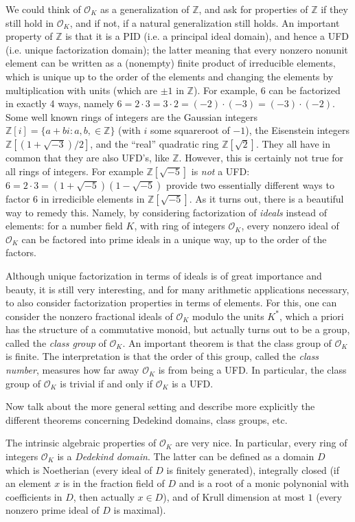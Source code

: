 \documentclass[a4paper,USenglish,cleveref, autoref, thm-restate]{lipics-v2021}
\newcommand{\OK}[1][K]{\mathcal{O}_{#1}}
\newcommand{\Z}{\mathbb{Z}}
\begin{document}
We could think of $\OK$ as a generalization of $\Z$, and ask for properties of $\Z$ if they still hold in $\OK$, and if not, if a natural generalization still holds. An important property of $\Z$ is that it is a PID (i.e. a principal ideal domain), and hence a UFD (i.e. unique factorization domain); the latter meaning that every nonzero nonunit element can be written as a (nonempty) finite product of irreducible elements, which is unique up to the order of the elements and changing the elements by multiplication with units (which are $\pm 1$ in $\Z$).
For example, $6$ can be factorized in exactly 4 ways, namely $6=2\cdot 3=3\cdot2=(-2)\cdot (-3)=(-3) \cdot (-2)$. Some well known rings of integers are the Gaussian integers $\Z[i]=\{a+b i : a,b, \in \Z\}$ (with $i$ some squareroot of $-1$), the Eisenstein integers $\Z[(1+\sqrt{-3})/2]$, and the ``real'' quadratic ring $\Z[\sqrt{2}]$. They all have in common that they are also UFD's, like $\Z$. However, this is certainly not true for all rings of integers. For example $\Z[\sqrt{-5}]$ is \emph{not} a UFD: $6=2\cdot3=(1+\sqrt{-5}) (1-\sqrt{-5})$ provide two essentially different ways to factor $6$ in irredicible elements in $\Z[\sqrt{-5}]$.
As it turns out, there is a beautiful way to remedy this. Namely,  by considering factorization of \emph{ideals} instead of elements: for a number field $K$, with ring of integers $\OK$, every nonzero ideal of $\OK$ can be factored into prime ideals in a unique way, up to the order of the factors.

Although unique factorization in terms of ideals is of great importance and beauty, it is still very interesting, and for many arithmetic applications necessary, to also consider factorization properties in terms of elements. For this, one can consider the nonzero fractional ideals of $\OK$ modulo the units $K^*$, which a priori has the structure of a commutative monoid, but actually turns out to be a group, called the \emph{class group} of $\OK$. An important theorem is that the class group of $\OK$ is finite. The interpretation is that the order of this group, called the \emph{class number}, measures how far away $\OK$ is from being a UFD. In particular, the class group of $\OK$ is trivial if and only if $\OK$ is a UFD.

Now talk about the more general setting and describe more explicitly  the different theorems concerning Dedekind domains, class groups, etc.

The intrinsic algebraic properties of $\OK$ are very nice. In particular, every ring of integers $\OK$ is a \emph{Dedekind domain}. The latter can be defined as a domain $D$ which is Noetherian (every ideal of $D$ is finitely generated), integrally closed (if an element $x$ is in the fraction field of $D$ and is a root of a monic polynonial with coefficients in  $D$, then actually $x \in D$), and of Krull dimension at most $1$ (every nonzero prime ideal of $D$ is maximal).
\end{document}
